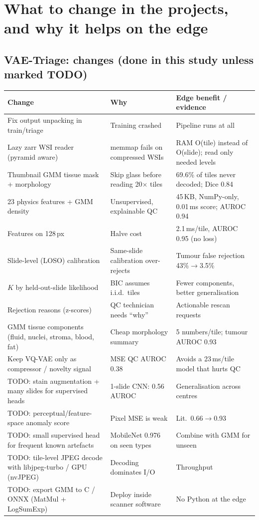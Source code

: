 \chapter{What to change in the projects, and why it helps on the edge}

\section{VAE-Triage: changes (done in this study unless marked TODO)}
\begin{longtable}{p{5.2cm}p{5.4cm}p{5.4cm}}\toprule
\textbf{Change} & \textbf{Why} & \textbf{Edge benefit / evidence}\\\midrule
Fix output unpacking in train/triage & Training crashed & Pipeline runs at all\\
Lazy zarr WSI reader (pyramid aware) & memmap fails on compressed WSIs & RAM O(tile) instead of O(slide); read only needed levels\\
Thumbnail GMM tissue mask + morphology & Skip glass before reading 20$\times$ tiles & 69.6\% of tiles never decoded; Dice 0.84\\
23 physics features + GMM density & Unsupervised, explainable QC & 45\,KB, NumPy-only, 0.01\,ms score; AUROC 0.94\\
Features on 128\,px & Halve cost & 2.1\,ms/tile, AUROC 0.95 (no loss)\\
Slide-level (LOSO) calibration & Same-slide calibration over-rejects & Tumour false rejection 43\%$\to$3.5\%\\
$K$ by held-out-slide likelihood & BIC assumes i.i.d.\ tiles & Fewer components, better generalisation\\
Rejection reasons (z-scores) & QC technician needs ``why'' & Actionable rescan requests\\
GMM tissue components (fluid, nuclei, stroma, blood, fat) & Cheap morphology summary & 5 numbers/tile; tumour AUROC 0.93\\
Keep VQ-VAE only as compressor / novelty signal & MSE QC AUROC 0.38 & Avoids a 23\,ms/tile model that hurts QC\\
TODO: stain augmentation + many slides for supervised heads & 1-slide CNN: 0.56 AUROC & Generalisation across centres\\
TODO: perceptual/feature-space anomaly score & Pixel MSE is weak & Lit.\ 0.66$\to$0.93\\
TODO: small supervised head for frequent known artefacts & MobileNet 0.976 on seen types & Combine with GMM for unseen\\
TODO: tile-level JPEG decode with libjpeg-turbo / GPU (nvJPEG) & Decoding dominates I/O & Throughput\\
TODO: export GMM to C / ONNX (MatMul + LogSumExp) & Deploy inside scanner software & No Python at the edge\\
\bottomrule\end{longtable}

